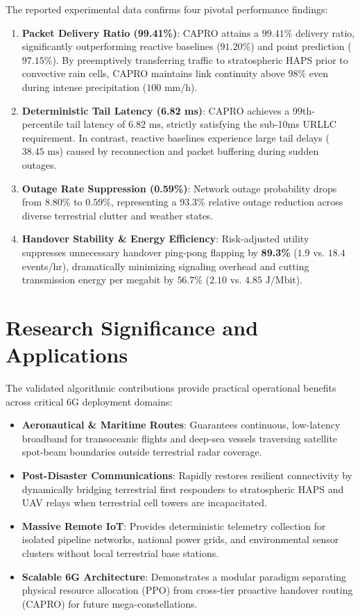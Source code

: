 \documentclass[a4paper]{article}
\begin{document}
The reported experimental data confirms four pivotal performance findings:
\begin{enumerate}\setlength{\itemsep}{1.2pt}\setlength{\parskip}{0pt}
  \item \textbf{Packet Delivery Ratio (99.41\%)}: CAPRO attains a $99.41\%$ delivery ratio, significantly outperforming reactive baselines ($91.20\%$) and point prediction ($97.15\%$). By preemptively transferring traffic to stratospheric HAPS prior to convective rain cells, CAPRO maintains link continuity above $98\%$ even during intense precipitation ($100\text{ mm/h}$).
  \item \textbf{Deterministic Tail Latency (6.82 ms)}: CAPRO achieves a 99th-percentile tail latency of $6.82\text{ ms}$, strictly satisfying the sub-10ms URLLC requirement. In contrast, reactive baselines experience large tail delays ($38.45\text{ ms}$) caused by reconnection and packet buffering during sudden outages.
  \item \textbf{Outage Rate Suppression (0.59\%)}: Network outage probability drops from $8.80\%$ to $0.59\%$, representing a $93.3\%$ relative outage reduction across diverse terrestrial clutter and weather states.
  \item \textbf{Handover Stability \& Energy Efficiency}: Risk-adjusted utility suppresses unnecessary handover ping-pong flapping by \textbf{89.3\%} ($1.9$ vs. $18.4$ events/hr), dramatically minimizing signaling overhead and cutting transmission energy per megabit by $56.7\%$ ($2.10$ vs. $4.85\text{ J/Mbit}$).
\end{enumerate}

\section{Research Significance and Applications}
The validated algorithmic contributions provide practical operational benefits across critical 6G deployment domains:
\begin{itemize}\setlength{\itemsep}{1.2pt}\setlength{\parskip}{0pt}
  \item \textbf{Aeronautical \& Maritime Routes}: Guarantees continuous, low-latency broadband for transoceanic flights and deep-sea vessels traversing satellite spot-beam boundaries outside terrestrial radar coverage.
  \item \textbf{Post-Disaster Communications}: Rapidly restores resilient connectivity by dynamically bridging terrestrial first responders to stratospheric HAPS and UAV relays when terrestrial cell towers are incapacitated.
  \item \textbf{Massive Remote IoT}: Provides deterministic telemetry collection for isolated pipeline networks, national power grids, and environmental sensor clusters without local terrestrial base stations.
  \item \textbf{Scalable 6G Architecture}: Demonstrates a modular paradigm separating physical resource allocation (PPO) from cross-tier proactive handover routing (CAPRO) for future mega-constellations.
\end{itemize}
\end{document}
